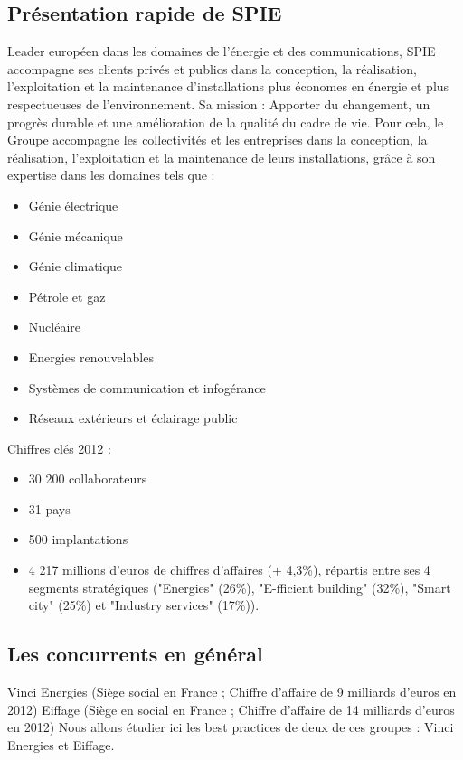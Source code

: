     \subsection{Présentation rapide de SPIE}
    	Leader européen dans les domaines de l'énergie et des communications, SPIE accompagne ses clients privés et publics dans la conception, la réalisation, l'exploitation et la maintenance d'installations plus économes en énergie et plus respectueuses de l'environnement.
    	Sa mission : Apporter du changement, un progrès durable et une amélioration de la qualité du cadre de vie.
    \newpage
    	Pour cela, le Groupe accompagne les collectivités et les entreprises dans la conception, la réalisation, l'exploitation et la maintenance de leurs installations, grâce à son expertise dans les domaines tels que :
    \begin{itemize}
    	\item Génie électrique
    	\item Génie mécanique
    	\item Génie climatique
    	\item Pétrole et gaz
    	\item Nucléaire
    	\item Energies renouvelables
    	\item Systèmes de communication et infogérance
    	\item Réseaux extérieurs et éclairage public
    \end{itemize}
    \bigbreak
    Chiffres clés 2012 :
    \begin{itemize}
    	\item 30 200 collaborateurs
    	\item 31 pays
    	\item 500 implantations
    	\item 4 217 millions d'euros de chiffres d'affaires (+ 4,3\%), répartis entre ses 4 segments stratégiques ("Energies" (26\%), "E-fficient building" (32\%), "Smart city" (25\%) et "Industry services" (17\%)).
    \end{itemize}

    \subsection{Les concurrents en général}
    Vinci Energies (Siège social en France ; Chiffre d'affaire de 9 milliards d’euros en 2012)
    Eiffage (Siège en social en France ; Chiffre d'affaire de 14 milliards d’euros en 2012)
    	Nous allons étudier ici les best practices de deux de ces groupes : Vinci Energies et Eiffage.

